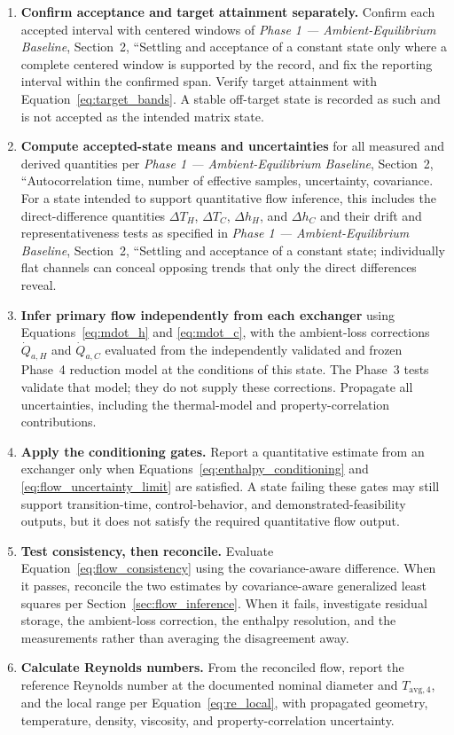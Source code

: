 \documentclass[11pt]{article}
\newcommand{\Tavg}{T_{\mathrm{avg},4}}
\newcommand{\PhaseOneDoc}{\textit{Phase 1 --- Ambient-Equilibrium Baseline}}
\begin{document}
\begin{enumerate}
    \item \textbf{Confirm acceptance and target attainment separately.} Confirm each accepted interval with centered windows of \PhaseOneDoc, Section~2, ``Settling and acceptance of a constant state only where a complete centered window is supported by the record, and fix the reporting interval within the confirmed span. Verify target attainment with Equation~\eqref{eq:target_bands}. A stable off-target state is recorded as such and is not accepted as the intended matrix state.

    \item \textbf{Compute accepted-state means and uncertainties} for all measured and derived quantities per \PhaseOneDoc, Section~2, ``Autocorrelation time, number of effective samples, uncertainty, covariance. For a state intended to support quantitative flow inference, this includes the direct-difference quantities $\Delta T_H$, $\Delta T_C$, $\Delta h_H$, and $\Delta h_C$ and their drift and representativeness tests as specified in \PhaseOneDoc, Section~2, ``Settling and acceptance of a constant state; individually flat channels can conceal opposing trends that only the direct differences reveal.

    \item \textbf{Infer primary flow independently from each exchanger} using Equations~\eqref{eq:mdot_h} and \eqref{eq:mdot_c}, with the ambient-loss corrections $\dot Q_{a,H}$ and $\dot Q_{a,C}$ evaluated from the independently validated and frozen Phase~4 reduction model at the conditions of this state. The Phase~3 tests validate that model; they do not supply these corrections. Propagate all uncertainties, including the thermal-model and property-correlation contributions.

    \item \textbf{Apply the conditioning gates.} Report a quantitative estimate from an exchanger only when Equations~\eqref{eq:enthalpy_conditioning} and \eqref{eq:flow_uncertainty_limit} are satisfied. A state failing these gates may still support transition-time, control-behavior, and demonstrated-feasibility outputs, but it does not satisfy the required quantitative flow output.

    \item \textbf{Test consistency, then reconcile.} Evaluate Equation~\eqref{eq:flow_consistency} using the covariance-aware difference. When it passes, reconcile the two estimates by covariance-aware generalized least squares per Section~\ref{sec:flow_inference}. When it fails, investigate residual storage, the ambient-loss correction, the enthalpy resolution, and the measurements rather than averaging the disagreement away.

    \item \textbf{Calculate Reynolds numbers.} From the reconciled flow, report the reference Reynolds number at the documented nominal diameter and $\Tavg$, and the local range per Equation~\eqref{eq:re_local}, with propagated geometry, temperature, density, viscosity, and property-correlation uncertainty.
\end{enumerate}
\end{document}

